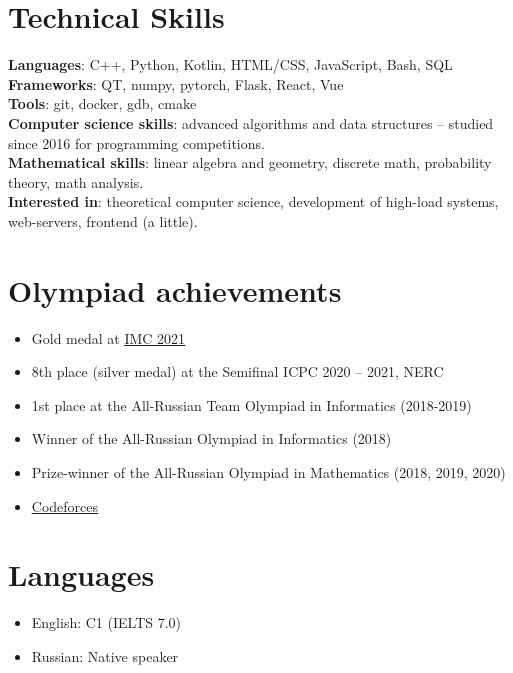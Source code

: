 \documentclass[letterpaper,11pt]{article}
\newcommand{\resumeItem}[1]{
    \item\small{
        {#1 \vspace{-2pt}}
    }
}
\newcommand{\resumeSubItem}[1]{\resumeItem{#1}\vspace{-4pt}}
\newcommand{\resumeItemListStart}{\begin{itemize}}
\newcommand{\resumeItemListEnd}{\end{itemize}\vspace{-5pt}}
\begin{document}
\section{Technical Skills}
\begin{itemize}[leftmargin=0.15in, label={}]
    \small{\item{
        \textbf{Languages}{: C++, Python, Kotlin, HTML/CSS, JavaScript, Bash, SQL} \\
        \textbf{Frameworks}{: QT, numpy, pytorch, Flask, React, Vue} \\
        \textbf{Tools}{: git, docker, gdb, cmake} \\
        \textbf{Computer science skills}{: advanced algorithms and data structures -- studied since 2016 for programming competitions.} \\
        \textbf{Mathematical skills}{: linear algebra and geometry, discrete math, probability theory, math analysis.} \\
        \textbf{Interested in}{: theoretical computer science, development of high-load systems, web-servers, frontend (a little).} \\
    }}
\end{itemize}
\vspace{-16pt}


\section{Olympiad achievements}
    \resumeItemListStart
        \resumeSubItem{Gold medal at \href{https://imc-math.org.uk/?year=2021}{\underline{IMC 2021}}}
        \resumeSubItem{8th place (silver medal) at the Semifinal ICPC 2020 – 2021, NERC}
        \resumeSubItem{1st place at the All-Russian Team Olympiad in Informatics (2018-2019)}
        \resumeSubItem{Winner of the All-Russian Olympiad in Informatics (2018)}
        \resumeSubItem{Prize-winner of the All-Russian Olympiad in Mathematics (2018, 2019, 2020)}
        \resumeSubItem{\href{https://codeforces.com/profile/Kuyan}{\underline{Codeforces}}}
    \resumeItemListEnd


\section{Languages}
    \resumeItemListStart
        \resumeSubItem{English: C1 (IELTS 7.0)}
        \resumeSubItem{Russian: Native speaker}
    \resumeItemListEnd
\end{document}
